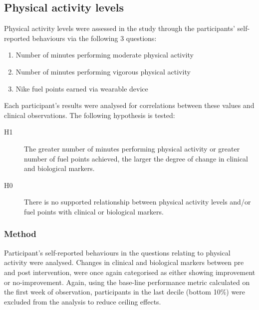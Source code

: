 \subsection{Physical activity levels}
Physical activity levels were assessed in the study through the participants' self-reported behaviours via the following 3 questions:
\begin{enumerate}[noitemsep,topsep=0pt]
	\item Number of minutes performing moderate physical activity
	\item Number of minutes performing vigorous physical activity
	\item Nike fuel points earned via wearable device
\end{enumerate}

Each participant’s results were analysed for correlations between these values and clinical observations. The following hypothesis is tested:
\begin{description}
  \item[H1] The greater number of minutes performing physical activity or greater number of fuel points achieved, the larger the degree of change in clinical and biological markers.
  \item[H0] There is no supported relationship between physical activity levels and/or fuel points with clinical or biological markers.
  \end{description}

\subsubsection{Method}
Participant's self-reported behaviours in the questions relating to physical activity were analysed. Changes in clinical and biological markers between pre and post intervention, were once again categorised as either showing improvement or no-improvement.
Again, using the base-line performance metric calculated on the first week of observation, participants in the last decile (bottom 10\%) were excluded from the analysis to reduce ceiling effects.

